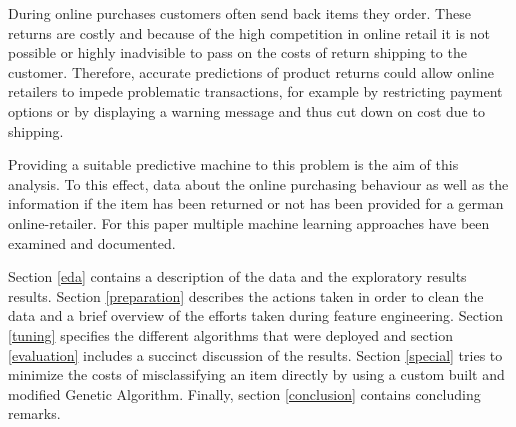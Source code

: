 During online purchases customers often send back items they order. These returns are costly and because of the high competition in online retail it is not possible or highly inadvisible to pass on the costs of return shipping to the customer. Therefore, accurate predictions of product returns could allow online retailers to impede problematic transactions, for example by restricting payment options or by displaying a warning message and thus cut down on cost due to shipping. 

Providing a suitable predictive machine to this problem is the aim of this analysis. To this effect, data about the online purchasing behaviour as well as the information if the item has been returned or not has been provided for a german online-retailer. For this paper multiple machine learning approaches have been examined and documented.

Section \ref{eda} contains a description of the data and the exploratory results results. Section \ref{preparation} describes the actions taken in order to clean the data and a brief overview of the efforts taken during feature engineering. Section \ref{tuning} specifies the different algorithms that were deployed and section \ref{evaluation} includes a succinct discussion of the results. Section \ref{special} tries to minimize the costs of misclassifying an item directly by using a custom built and modified Genetic Algorithm. Finally, section \ref{conclusion} contains concluding remarks. 